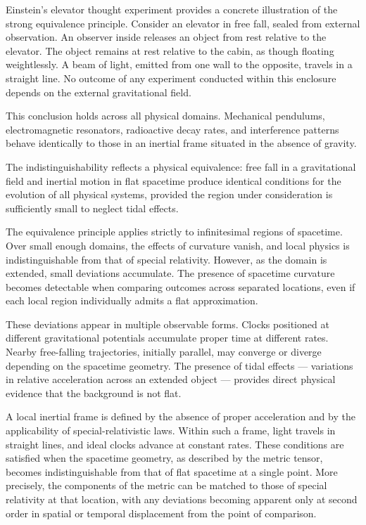 Einstein’s elevator thought experiment provides a concrete illustration of the strong equivalence principle. Consider an elevator in free fall, sealed from external observation. An observer inside releases an object from rest relative to the elevator. The object remains at rest relative to the cabin, as though floating weightlessly. A beam of light, emitted from one wall to the opposite, travels in a straight line. No outcome of any experiment conducted within this enclosure depends on the external gravitational field.

This conclusion holds across all physical domains. Mechanical pendulums, electromagnetic resonators, radioactive decay rates, and interference patterns behave identically to those in an inertial frame situated in the absence of gravity.

The indistinguishability reflects a physical equivalence: free fall in a gravitational field and inertial motion in flat spacetime produce identical conditions for the evolution of all physical systems, provided the region under consideration is sufficiently small to neglect tidal effects.

The equivalence principle applies strictly to infinitesimal regions of spacetime. Over small enough domains, the effects of curvature vanish, and local physics is indistinguishable from that of special relativity. However, as the domain is extended, small deviations accumulate. The presence of spacetime curvature becomes detectable when comparing outcomes across separated locations, even if each local region individually admits a flat approximation.

These deviations appear in multiple observable forms. Clocks positioned at different gravitational potentials accumulate proper time at different rates. Nearby free-falling trajectories, initially parallel, may converge or diverge depending on the spacetime geometry. The presence of tidal effects — variations in relative acceleration across an extended object — provides direct physical evidence that the background is not flat.

A local inertial frame is defined by the absence of proper acceleration and by the applicability of special-relativistic laws. Within such a frame, light travels in straight lines, and ideal clocks advance at constant rates. These conditions are satisfied when the spacetime geometry, as described by the metric tensor, becomes indistinguishable from that of flat spacetime at a single point. More precisely, the components of the metric can be matched to those of special relativity at that location, with any deviations becoming apparent only at second order in spatial or temporal displacement from the point of comparison.

